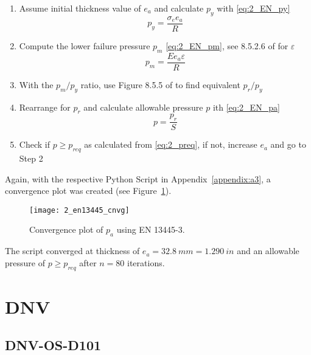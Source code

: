 \begin{enumerate}
	\item Assume initial thickness value of $e_a$ and calculate $p_y$ with \ref{eq:2_EN_py}
	      \begin{equation}
	      	\label{eq:2_EN_py}
	      	p_y = \frac{\sigma_e e_a}{R}
	      \end{equation}
	\item Compute the lower failure pressure $p_m$ \ref{eq:2_EN_pm}, see 8.5.2.6 of \cite{EN134453} for $\varepsilon$
	      \begin{equation}
	      	\label{eq:2_EN_pm}
	      	p_m = \frac{E e_a  \varepsilon}{R}
	      \end{equation}
	\item With the $p_m/p_y$ ratio, use Figure 8.5.5 of \cite{EN134453} to find equivalent $p_r/p_y$
	\item Rearrange for $p_r$ and calculate allowable pressure $p$ ith \ref{eq:2_EN_pa}
	      \begin{equation}
	      	\label{eq:2_EN_pa}
	      	p = \frac{p_r}{S}
	      \end{equation}
	\item Check if $p \geq p_{req}$ as calculated from \ref{eq:2_preq}, if not, increase $e_a$ and go to Step 2\\
\end{enumerate}

Again, with the respective Python Script in Appendix~\ref{appendix:a3}, a convergence plot was created (see Figure~\ref{fig:2_en13445_cnvg}).
\begin{figure}[H]
	\centering
	\texttt{[image: 2\_en13445\_cnvg]}
	\caption{Convergence plot of $p_a$ using EN 13445-3.}
	\label{fig:2_en13445_cnvg}
\end{figure}

The script converged at thickness of $e_a = 32.8\ mm = 1.290\ in$ and an allowable pressure of $p\geq p_{req}$ after $n=80$ iterations. 

\section{DNV}

\subsection{DNV-OS-D101}


